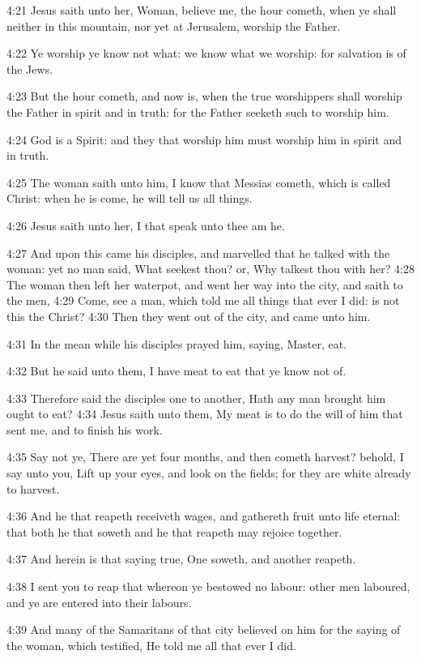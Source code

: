 4:21 Jesus saith unto her, Woman, believe me, the hour cometh, when ye shall neither in this mountain, nor yet at Jerusalem, worship the Father.

4:22 Ye worship ye know not what: we know what we worship: for salvation is of the Jews.

4:23 But the hour cometh, and now is, when the true worshippers shall worship the Father in spirit and in truth: for the Father seeketh such to worship him.

4:24 God is a Spirit: and they that worship him must worship him in spirit and in truth.

4:25 The woman saith unto him, I know that Messias cometh, which is called Christ: when he is come, he will tell us all things.

4:26 Jesus saith unto her, I that speak unto thee am he.

4:27 And upon this came his disciples, and marvelled that he talked with the woman: yet no man said, What seekest thou? or, Why talkest thou with her?  4:28 The woman then left her waterpot, and went her way into the city, and saith to the men, 4:29 Come, see a man, which told me all things that ever I did: is not this the Christ?  4:30 Then they went out of the city, and came unto him.

4:31 In the mean while his disciples prayed him, saying, Master, eat.

4:32 But he said unto them, I have meat to eat that ye know not of.

4:33 Therefore said the disciples one to another, Hath any man brought him ought to eat?  4:34 Jesus saith unto them, My meat is to do the will of him that sent me, and to finish his work.

4:35 Say not ye, There are yet four months, and then cometh harvest?  behold, I say unto you, Lift up your eyes, and look on the fields; for they are white already to harvest.

4:36 And he that reapeth receiveth wages, and gathereth fruit unto life eternal: that both he that soweth and he that reapeth may rejoice together.

4:37 And herein is that saying true, One soweth, and another reapeth.

4:38 I sent you to reap that whereon ye bestowed no labour: other men laboured, and ye are entered into their labours.

4:39 And many of the Samaritans of that city believed on him for the saying of the woman, which testified, He told me all that ever I did.

